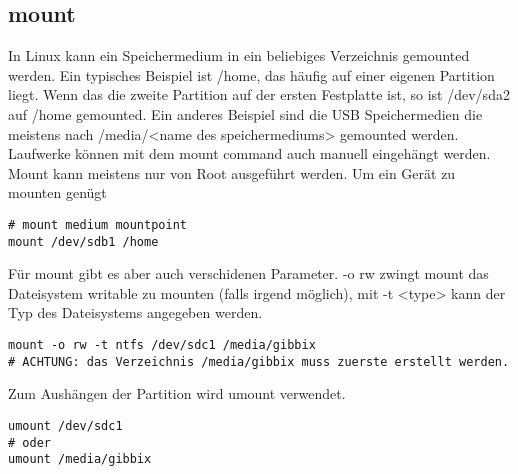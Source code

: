 \subsection{mount}
In Linux kann ein Speichermedium in ein beliebiges Verzeichnis gemounted werden. Ein typisches Beispiel ist /home, das h\"aufig auf einer eigenen Partition liegt. Wenn das die zweite Partition auf der ersten Festplatte ist, so ist /dev/sda2 auf /home gemounted. Ein anderes Beispiel sind die USB Speichermedien die meistens nach /media/<name des speichermediums> gemounted werden.\\
Laufwerke k\"onnen mit dem mount command auch manuell eingeh\"angt werden. Mount kann meistens nur von Root ausgef\"uhrt werden. Um ein Ger\"at zu mounten gen\"ugt
\begin{lstlisting}[frame=single]
# mount medium mountpoint
mount /dev/sdb1 /home
\end{lstlisting}
F\"ur mount gibt es aber auch verschidenen Parameter. -o rw zwingt mount das Dateisystem writable zu mounten (falls irgend m\"oglich), mit -t <type> kann der Typ des Dateisystems angegeben werden.
\begin{lstlisting}[frame=single]
mount -o rw -t ntfs /dev/sdc1 /media/gibbix
# ACHTUNG: das Verzeichnis /media/gibbix muss zuerste erstellt werden.
\end{lstlisting}
Zum Aush\"angen der Partition wird umount verwendet.
\begin{lstlisting}[frame=single]
umount /dev/sdc1
# oder
umount /media/gibbix
\end{lstlisting}
